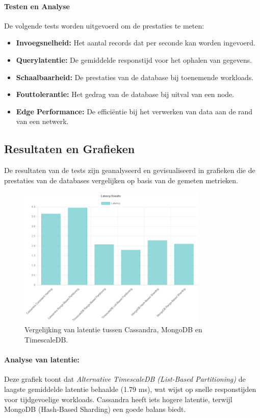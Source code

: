 \paragraph{Testen en Analyse}
De volgende tests worden uitgevoerd om de prestaties te meten:
\begin{itemize}
    \item \textbf{Invoegsnelheid:} Het aantal records dat per seconde kan worden ingevoerd.
    \item \textbf{Querylatentie:} De gemiddelde responstijd voor het ophalen van gegevens.
    \item \textbf{Schaalbaarheid:} De prestaties van de database bij toenemende workloads.
    \item \textbf{Fouttolerantie:} Het gedrag van de database bij uitval van een node.
    \item \textbf{Edge Performance:} De efficiëntie bij het verwerken van data aan de rand van een netwerk.
\end{itemize}

\subsection{Resultaten en Grafieken}
De resultaten van de tests zijn geanalyseerd en gevisualiseerd in grafieken die de prestaties van de databases vergelijken op basis van de gemeten metrieken.

\begin{figure}[H]
    \centering
    \includegraphics[width=0.8\textwidth]{Latency.png}
    \caption{Vergelijking van latentie tussen Cassandra, MongoDB en TimescaleDB.}
    \label{fig:latency-comparison}
\end{figure}

\paragraph{Analyse van latentie:}
Deze grafiek toont dat \textit{Alternative TimescaleDB (List-Based Partitioning)} de laagste gemiddelde latentie behaalde (1.79 ms), wat wijst op snelle responstijden voor tijdgevoelige workloads. Cassandra heeft iets hogere latentie, terwijl MongoDB (Hash-Based Sharding) een goede balans biedt.

